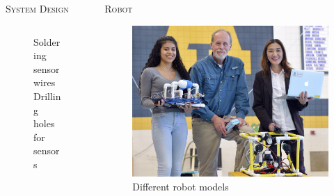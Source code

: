 \documentclass[final,t]{beamer}
\begin{document}
\begin{frame}{}
\begin{columns}
\begin{column}{.5\linewidth}
\begin{block}{\textsc{System Design}}
\begin{center}
\begin{figure}
\begin{tabular}{cc}
                    \end{tabular}
                    \caption{Soldering sensor wires \hspace{30mm} Drilling holes for sensors}
                    \end{figure}
                    \end{center}

                    \vspace*{6mm}
                \end{block}
            \end{column}

            \begin{column}{.5\linewidth}

                \begin{block}{\textsc{Robot}}
                    \vspace*{6mm}
                    \begin{figure}
                        \includegraphics[scale = 0.5]{assets/group_pic.jpg}
                        \caption{Different robot models}
                    \end{figure}
                \end{block}


\end{column}
\end{columns}
\end{frame}
\end{document}
